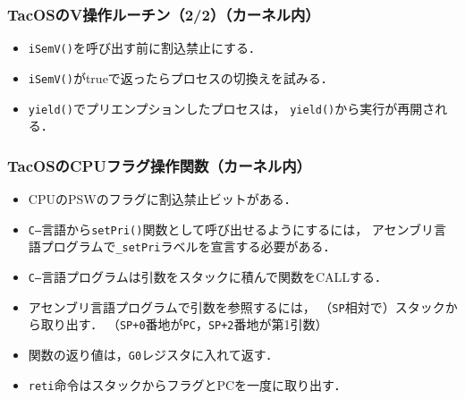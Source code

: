 \documentclass{beamer}                   %
\begin{document}
\begin{frame}
  \frametitle{TacOSのV操作ルーチン（2/2）（カーネル内）}
  \begin{itemize}
  \item {\tt iSemV()}を呼び出す前に割込禁止にする．
  \item {\tt iSemV()}がtrueで返ったらプロセスの切換えを試みる．
  \item {\tt yield()}でプリエンプションしたプロセスは，
    {\tt yield()}から実行が再開される．
  \end{itemize}
\end{frame}

\begin{frame}
  \frametitle{TacOSのCPUフラグ操作関数（カーネル内）}
  \begin{itemize}
  \item CPUのPSWのフラグに割込禁止ビットがある．
  \item {\tt C--}言語から{\tt setPri()}関数として呼び出せるようにするには，
    アセンブリ言語プログラムで{\tt \_setPri}ラベルを宣言する必要がある．
  \item {\tt C--}言語プログラムは引数をスタックに積んで関数をCALLする．
  \item アセンブリ言語プログラムで引数を参照するには，
    （{\tt SP}相対で）スタックから取り出す．
    （{\tt SP+0}番地が{\tt PC}，{\tt SP+2}番地が第1引数）
  \item 関数の返り値は，{\tt G0}レジスタに入れて返す．
  \item {\tt reti}命令はスタックからフラグとPCを一度に取り出す．
  \end{itemize}
\end{frame}
\end{document}
